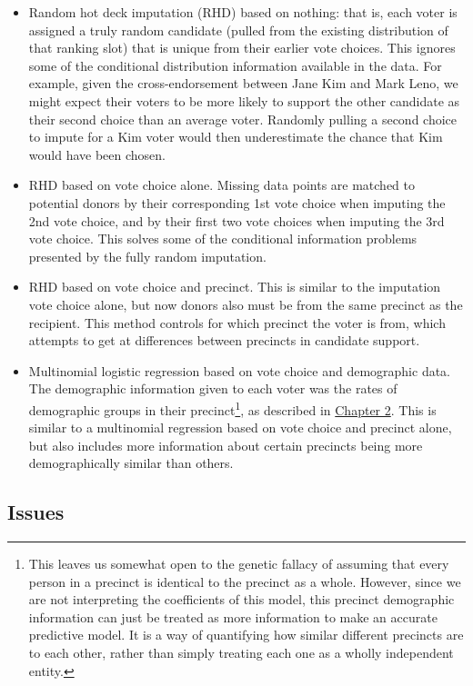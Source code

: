 \documentclass[12pt,twoside]{reedthesis}
\begin{document}
\begin{itemize}
\item
  Random hot deck imputation (RHD) based on nothing: that is, each voter is assigned a truly random candidate (pulled from the existing distribution of that ranking slot) that is unique from their earlier vote choices. This ignores some of the conditional distribution information available in the data. For example, given the cross-endorsement between Jane Kim and Mark Leno, we might expect their voters to be more likely to support the other candidate as their second choice than an average voter. Randomly pulling a second choice to impute for a Kim voter would then underestimate the chance that Kim would have been chosen.
\item
  RHD based on vote choice alone. Missing data points are matched to potential donors by their corresponding 1st vote choice when imputing the 2nd vote choice, and by their first two vote choices when imputing the 3rd vote choice. This solves some of the conditional information problems presented by the fully random imputation.
\item
  RHD based on vote choice and precinct. This is similar to the imputation vote choice alone, but now donors also must be from the same precinct as the recipient. This method controls for which precinct the voter is from, which attempts to get at differences between precincts in candidate support.
\item
  Multinomial logistic regression based on vote choice and demographic data. The demographic information given to each voter was the rates of demographic groups in their precinct\footnote{This leaves us somewhat open to the genetic fallacy of assuming that every person in a precinct is identical to the precinct as a whole. However, since we are not interpreting the coefficients of this model, this precinct demographic information can just be treated as more information to make an accurate predictive model. It is a way of quantifying how similar different precincts are to each other, rather than simply treating each one as a wholly independent entity.}, as described in \protect\hyperlink{demo-methods}{Chapter 2}. This is similar to a multinomial regression based on vote choice and precinct alone, but also includes more information about certain precincts being more demographically similar than others.
\end{itemize}
\hypertarget{issues}{%
\subsection{Issues}\label{issues}}
\end{document}

